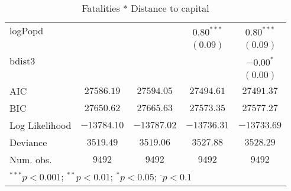 \begin{sidewaystable}
\begin{center}
{\begin{tabular}{l c c c c}
logPopd              &               &               & $0.80^{***}$  & $0.80^{***}$    \\
                     &               &               & $(0.09)$      & $(0.09)$        \\
bdist3               &               &               &               & $-0.00^{*}$     \\
                     &               &               &               & $(0.00)$        \\
\hline
AIC                  & $27586.19$    & $27594.05$    & $27494.61$    & $27491.37$      \\
BIC                  & $27650.62$    & $27665.63$    & $27573.35$    & $27577.27$      \\
Log Likelihood       & $-13784.10$   & $-13787.02$   & $-13736.31$   & $-13733.69$     \\
Deviance             & $3519.49$     & $3519.06$     & $3527.88$     & $3528.29$       \\
Num. obs.            & $9492$        & $9492$        & $9492$        & $9492$          \\
\hline
\multicolumn{5}{l}{\scriptsize{$^{***}p<0.001$; $^{**}p<0.01$; $^{*}p<0.05$; $^{\cdot}p<0.1$}}
\end{tabular}
}
\caption{Fatalities * Distance to capital}
\label{interaction_statebaseddeaths}
\end{center}
\end{sidewaystable}
